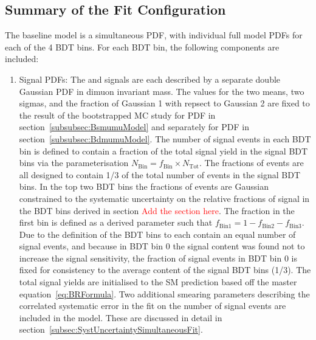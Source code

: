 
\clearpage

\subsection{Summary of the Fit Configuration}
\label{subsec:FitConfig}

The baseline model is a simultaneous PDF, with individual full model PDFs for each of the 4 BDT bins. For each BDT bin, the following components are included:

\begin{enumerate}
\item Signal PDFs: The \Bsmumu and \Bdmumu signals are each described by a separate double Gaussian PDF in dimuon invariant mass. The values for the two means, two sigmas, and the fraction of Gaussian 1 with repsect to Gaussian 2 are fixed to the result of the bootstrapped MC study for \Bsmumu PDF in section~\ref{subsubsec:BsmumuModel} and separately for \Bdmumu PDF in section~\ref{subsubsec:BdmumuModel}. The number of signal events in each BDT bin is defined to contain a fraction of the total signal yield in the signal BDT bins via the parameterisation $N_{\text{Bin}} = f_{\text{Bin}}\times N_{\text{Tot}}$. The fractions of events are all designed to contain 1/3 of the total number of events in the signal BDT bins. In the top two BDT bins the fractions of events are Gaussian constrained to the systematic uncertainty on the relative fractions of signal in the BDT bins derived in section \textcolor{red}{Add the section here}. The fraction in the first bin is defined as a derived parameter such that $f_{\text{Bin1}} = 1 - f_{\text{Bin2}} - f_{\text{Bin3}}$. Due to the definition of the BDT bins to each contain an equal number of signal events, and because in BDT bin 0 the signal content was found not to increase the signal sensitivity, the fraction of signal events in BDT bin 0 is fixed for consistency to the average content of the signal BDT bins (1/3). The total signal yields are initialised to the SM prediction based off the master equation~\ref{eq:BRFormula}. Two additional smearing parameters describing the correlated systematic error in the fit on the number of signal events are included in the model. These are discussed in detail in section~\ref{subsec:SystUncertaintySimultaneousFit}.

\end{enumerate}
